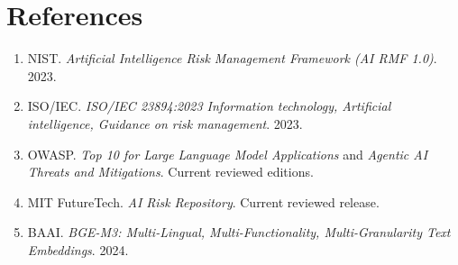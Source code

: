 \documentclass[11pt,a4paper]{article}
\begin{document}
\section*{References}

\begin{enumerate}[leftmargin=2em]
  \item NIST. \textit{Artificial Intelligence Risk Management Framework
  (AI RMF 1.0)}. 2023.
  \item ISO/IEC. \textit{ISO/IEC 23894:2023 Information technology,
  Artificial intelligence, Guidance on risk management}. 2023.
  \item OWASP. \textit{Top 10 for Large Language Model Applications} and
  \textit{Agentic AI Threats and Mitigations}. Current reviewed editions.
  \item MIT FutureTech. \textit{AI Risk Repository}. Current reviewed release.
  \item BAAI. \textit{BGE-M3: Multi-Lingual, Multi-Functionality,
  Multi-Granularity Text Embeddings}. 2024.
\end{enumerate}
\end{document}
